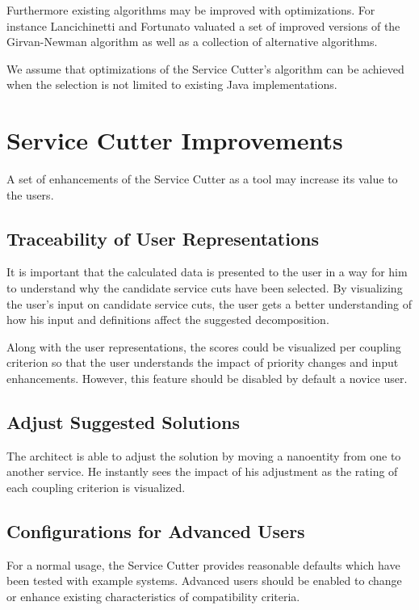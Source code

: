 Furthermore existing algorithms may be improved with optimizations. For instance Lancichinetti and Fortunato\cite{lancichinetti2009community} valuated a set of improved versions of the Girvan-Newman algorithm as well as a collection of alternative algorithms.

We assume that optimizations of the Service Cutter's algorithm can be achieved when the selection is not limited to existing Java implementations.

\section{Service Cutter Improvements}

A set of enhancements of the Service Cutter as a tool may increase its value to the users.

\subsection{Traceability of User Representations}

It is important that the calculated data is presented to the user in a way for him to understand why the candidate service cuts have been selected. By visualizing the user's input on candidate service cuts, the user gets a better understanding of how his input and definitions affect the suggested decomposition. 

Along with the user representations, the scores could be visualized per coupling criterion so that the user understands the impact of priority changes and input enhancements. However, this feature should be disabled by default a novice user. 

\subsection{Adjust Suggested Solutions}

The architect is able to adjust the solution by moving a nanoentity from one to another service. He instantly sees the impact of his adjustment as the rating of each coupling criterion is visualized.

\subsection{Configurations for Advanced Users}

For a normal usage, the Service Cutter provides reasonable defaults which have been tested with example systems. Advanced users should be enabled to change or enhance existing characteristics of compatibility criteria.

